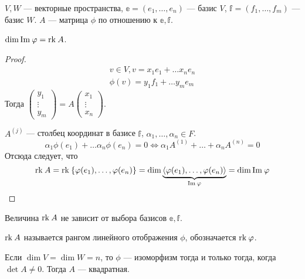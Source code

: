 $V, W$ --- векторные пространства, $\mathbb{e} = (e_1, \ldots, e_n)$ --- базис $V$, $\mathbb{f} = (f_1, \ldots, f_m)$ --- базис $W$. $A$ --- матрица $\phi$ по отношению к $\mathbb{e}, \mathbb{f}$.
\begin{Suggestion}
    $\dim \mathrm{Im\:} \varphi = \mathrm{rk}\: A$.
\end{Suggestion}
\begin{proof}
    \begin{gather*}
        v \in V, v = x_1e_1 + \ldots x_ne_n\\
        \phi(v) = y_1f_1 + \ldots y_me_m 
    \end{gather*}
    Тогда
    $\begin{pmatrix}
        y_1\\
        \vdots\\
        y_m
    \end{pmatrix}
    = A \begin{pmatrix}
        x_1\\
        \vdots\\
        x_n
    \end{pmatrix}$.\\
   \par  $A^{\left(j\right)}$ --- столбец координат в базисе $\mathbb{f}$, $\alpha_1, \ldots, \alpha_n \in F$.
   \[
        \alpha_1 \phi(e_1) + \ldots \alpha_n \phi(e_n) = 0 \Leftrightarrow \alpha_1 A^{\left(1\right)} + \ldots + \alpha_n A^{\left(n\right)} = 0
   \]
   Отсюда следует, что
   \[
        \mathrm{rk}\: A = \mathrm{rk}\:\{\varphi(e_1), \ldots, \varphi(e_n)\} = \dim \underbrace{\langle\varphi(e_1), \ldots, \varphi(e_n)\rangle}_{\mathrm{Im\:}\varphi} = \dim \mathrm{Im\:} \varphi
   \]
\end{proof}

\begin{Consequence}
    Величина $\mathrm{rk}\: A$ не зависит от выбора базисов $\mathbb{e}, \mathbb{f}$.
\end{Consequence}

\begin{Def}
    $\mathrm{rk}\: A$ называется рангом линейного отображения $\phi$, обозначается $\mathrm{rk}\: \varphi$.
\end{Def}
\begin{Consequence}
    Если $\dim V = \dim W = n$, то $\phi$ --- изоморфизм тогда и только тогда, когда $\det A \neq 0$. Тогда $A$ --- квадратная.
\end{Consequence}

